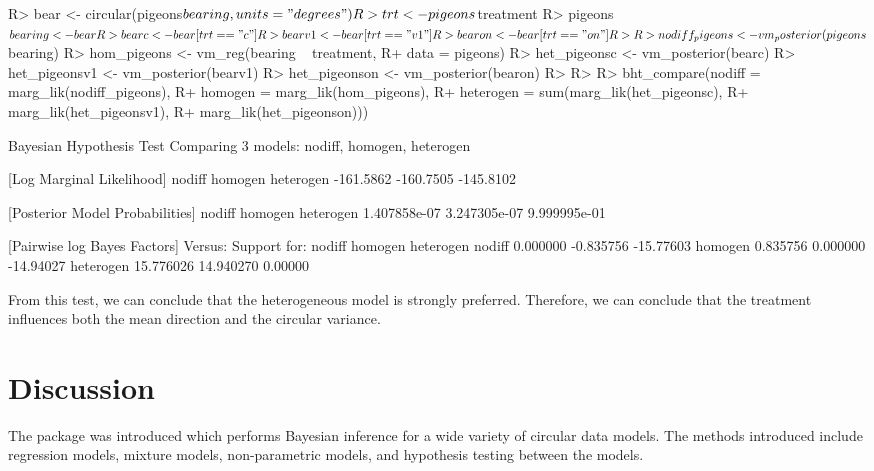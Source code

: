 \begin{CodeChunk}

\begin{CodeInput}
R> bear <- circular(pigeons$bearing, units = "degrees")
R> trt  <- pigeons$treatment
R> pigeons$bearing <- bear
R> bearc           <- bear[trt == "c"]
R> bearv1          <- bear[trt == "v1"]
R> bearon          <- bear[trt == "on"]
R> 
R> nodiff_pigeons <- vm_posterior(pigeons$bearing)
R> hom_pigeons    <- vm_reg(bearing ~ treatment, 
R+                          data = pigeons)
R> het_pigeonsc   <- vm_posterior(bearc)
R> het_pigeonsv1  <- vm_posterior(bearv1)
R> het_pigeonson  <- vm_posterior(bearon)
R> 
R> 
R> bht_compare(nodiff    = marg_lik(nodiff_pigeons), 
R+             homogen   = marg_lik(hom_pigeons), 
R+             heterogen = sum(marg_lik(het_pigeonsc), 
R+                             marg_lik(het_pigeonsv1), 
R+                             marg_lik(het_pigeonson)))
\end{CodeInput}

\begin{CodeOutput}
Bayesian Hypothesis Test
    Comparing 3 models: nodiff, homogen, heterogen

[Log Marginal Likelihood]
   nodiff   homogen heterogen 
-161.5862 -160.7505 -145.8102 

[Posterior Model Probabilities]
      nodiff      homogen    heterogen 
1.407858e-07 3.247305e-07 9.999995e-01 

[Pairwise log Bayes Factors]
               Versus: 
Support for:       nodiff   homogen heterogen
      nodiff     0.000000 -0.835756 -15.77603
      homogen    0.835756  0.000000 -14.94027
      heterogen 15.776026 14.940270   0.00000
\end{CodeOutput}
\end{CodeChunk}

From this test, we can conclude that the heterogeneous model is strongly
preferred. Therefore, we can conclude that the treatment influences both
the mean direction and the circular variance.

\hypertarget{discussion}{%
\section{Discussion}\label{discussion}}

\label{secjss:discussion}

The  package  was introduced which performs
Bayesian inference for a wide variety of circular data models. The
methods introduced include regression models, mixture models,
non-parametric models, and hypothesis testing between the models.

